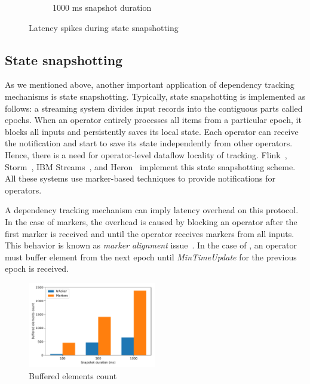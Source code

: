 \begin{figure}[t!]
\begin{subfigure}[b]{0.32\textwidth}
            \caption{1000 ms snapshot duration}
            \label{1000ms_snapshot}
    \end{subfigure}
    \caption{Latency spikes during state snapshotting}
    \label{snapshot_spikes}
\end{figure}

\subsection{State snapshotting} \label{snapshotting}

As we mentioned above, another important application of dependency tracking mechanisms is state snapshotting. Typically, state snapshotting is implemented as follows: a streaming system divides input records into the contiguous parts called epochs. When an operator entirely processes all items from a particular epoch, it blocks all inputs and persistently saves its local state. Each operator can receive the notification and start to save its state independently from other operators. Hence, there is a need for operator-level dataflow locality of tracking. Flink~\cite{Carbone:2017:SMA:3137765.3137777}, Storm~\cite{apache:storm:state}, IBM Streams~\cite{jacques2016consistent}, and Heron~\cite{Kulkarni:2015:THS:2723372.2742788} implement this state snapshotting scheme. All these systems use marker-based techniques to provide notifications for operators.

A dependency tracking mechanism can imply latency overhead on this protocol. In the case of markers, the overhead is caused by blocking an operator after the first marker is received and until the operator receives markers from all inputs. This behavior is known as {\em marker alignment} issue~\cite{Carbone:2017:SMA:3137765.3137777}. In the case of \tracker , an operator must buffer element from the next epoch until {\em MinTimeUpdate} for the previous epoch is received.

\begin{figure}[htbp]
  \centering
  \includegraphics[width=0.50\textwidth]{pics/buffering_count_bars.pdf}
  \caption{Buffered elements count}
  \label{snapshot_buffered}
\end{figure}

